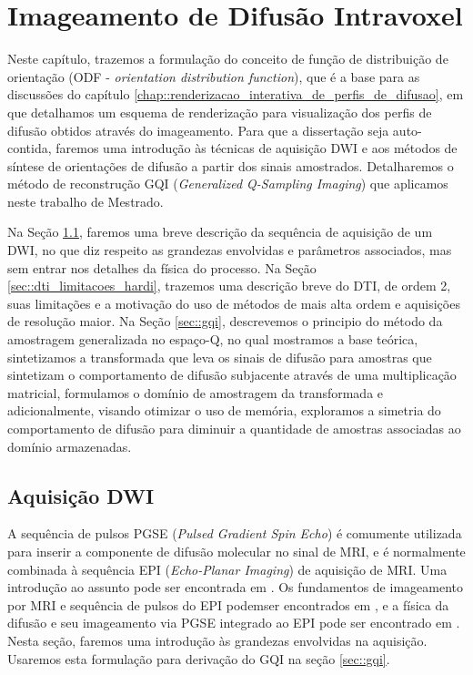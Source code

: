 \documentclass[
    12pt,                %
    oneside,            %
    a4paper,            %
    english,            %
    french,                %
    spanish,            %
    brazil                %
    ]{abntex2}
\begin{document}
\chapter{Imageamento de Difusão Intravoxel}
\label{chapter::metodos_hardi}

Neste capítulo, trazemos a formulação do conceito de função de distribuição de orientação (ODF - \textit{orientation distribution function}), que é a base para as discussões do capítulo \ref{chap::renderizacao_interativa_de_perfis_de_difusao}, em que detalhamos um esquema de renderização para visualização dos perfis de difusão obtidos através do imageamento. Para que a dissertação seja auto-contida, faremos uma introdução às técnicas de aquisição DWI e aos métodos de síntese de orientações de difusão a partir dos sinais amostrados. Detalharemos o método de reconstrução GQI (\textit{Generalized Q-Sampling Imaging}) que aplicamos neste trabalho de Mestrado.

Na Seção \ref{sec::aquisicao_dwi}, faremos uma breve descrição da sequência de aquisição de um DWI, no que diz respeito as grandezas envolvidas e parâmetros associados, mas sem entrar nos detalhes da física do processo. Na Seção \ref{sec::dti_limitacoes_hardi}, trazemos uma descrição breve do DTI, de ordem 2, suas limitações e a motivação do uso de métodos de mais alta ordem e aquisições de resolução maior. Na Seção \ref{sec::gqi}, descrevemos o principio do método da amostragem generalizada no espaço-Q, no qual mostramos a base teórica, sintetizamos a transformada que leva os sinais de difusão para amostras que sintetizam o comportamento de difusão subjacente através de uma multiplicação matricial, formulamos o domínio de amostragem da transformada e adicionalmente, visando otimizar o uso de memória, exploramos a simetria do comportamento de difusão para diminuir a quantidade de amostras associadas ao domínio armazenadas.

\section{Aquisição DWI}
\label{sec::aquisicao_dwi}
A sequência de pulsos PGSE (\textit{Pulsed Gradient Spin Echo}) é comumente utilizada para inserir a componente de difusão molecular no sinal de MRI, e é normalmente combinada à sequência  EPI (\textit{Echo-Planar Imaging}) de aquisição de MRI. Uma introdução ao assunto pode ser encontrada em . Os fundamentos de imageamento por MRI e sequência de pulsos do EPI podemser encontrados em , e a física da difusão e seu imageamento via PGSE integrado ao EPI pode ser encontrado em . Nesta seção, faremos uma introdução às grandezas envolvidas na aquisição. Usaremos esta formulação para derivação do GQI na seção \ref{sec::gqi}.
\end{document}
